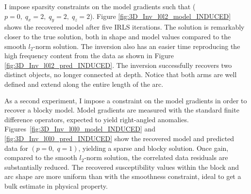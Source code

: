 I impose sparsity constraints on the model gradients such that ($p=0,\; q_x=2,\; q_y=2,\; q_z=2$).
 Figure \ref{fig:3D_Inv_l0l2_model_INDUCED} shows the recovered model after five IRLS iterations. The solution is remarkably closer to the true solution, both in shape and model values compared to the smooth $l_2$-norm solution. The inversion also has an easier time reproducing the high frequency content from the data as shown in Figure \ref{fig:3D_Inv_l0l2_pred_INDUCED}. The inversion successfully recovers two distinct objects, no longer connected at depth. Notice that both arms are well defined and extend along the entire length of the arc.
 
As a second experiment, I impose a constraint on the model gradients in order to recover a blocky model.
Model gradients are measured with the standard finite difference operators, expected to yield right-angled anomalies.
Figures~\ref{fig:3D_Inv_l0l0_model_INDUCED} and \ref{fig:3D_Inv_l0l0_pred_INDUCED} show the recovered model and predicted data for $(p = 0,\; q = 1)$, yielding a sparse and blocky solution.
Once gain, compared to the smooth $l_2$-norm solution, the correlated data residuals are substantially reduced.
The recovered susceptibility values within the block and arc shape are more uniform than with the smoothness constraint, ideal to get a bulk estimate in physical property.
 

